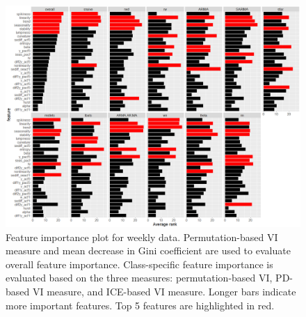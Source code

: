 \documentclass[11pt,a4paper,]{article}
\begin{document}
\begin{figure}[h]

{\centering \includegraphics{figures/viweekly-1} 

}

\caption{Feature importance plot for weekly data. Permutation-based VI measure and mean decrease in Gini coefficient are used to evaluate overall feature importance. Class-specific feature importance is evaluated based on the three measures: permutation-based VI, PD-based VI measure, and ICE-based VI measure. Longer bars indicate more important features. Top 5 features are highlighted in red.}\label{fig:viweekly}
\end{figure}

\newpage
\end{document}

